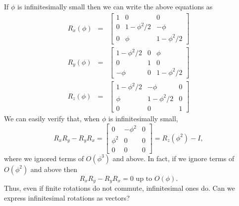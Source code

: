 \documentclass{article}
\numberwithin{equation}{section}
\begin{document}
If $\phi$ is infinitesimally small then we can write the above equations as
\begin{eqnarray}
R_x(\phi) &=& \begin{bmatrix}1 & 0 & 0 \\
0 & 1 - \phi^2/2 & -\phi \\
0 & \phi & 1 - \phi^2/2
\end{bmatrix} \label{s2e5} \\
R_y(\phi) &=& \begin{bmatrix}1 - \phi^2/2 & 0 & \phi \\
0 & 1 & 0 \\
-\phi & 0 & 1 - \phi^2/2
\end{bmatrix} \label{s2e6} \\
R_z(\phi) &=& \begin{bmatrix}1 - \phi^2/2 & -\phi & 0 \\
\phi & 1 - \phi^2/2 & 0 \\
0 & 0 & 1
\end{bmatrix} \label{s2e7}
\end{eqnarray}
We can easily verify that, when $\phi$ is infinitesimally small,
\begin{equation}\label{s2e8}
R_xR_y - R_yR_x = \begin{bmatrix}0 & -\phi^2 & 0 \\
\phi^2 & 0 & 0 \\
0 & 0 & 0 \end{bmatrix} = R_z(\phi^2) - I,
\end{equation}
where we ignored terms of $O(\phi^3)$ and above. In fact, if we ignore terms
of $O(\phi^2)$ and above then 
\begin{equation}\label{s2e9}
R_xR_y - R_yR_x = 0 \text{ up to } O(\phi).
\end{equation}
Thus, even if finite rotations do not commute, infinitesimal ones do. Can we 
express infinitesimal rotations as vectors?
\end{document}

